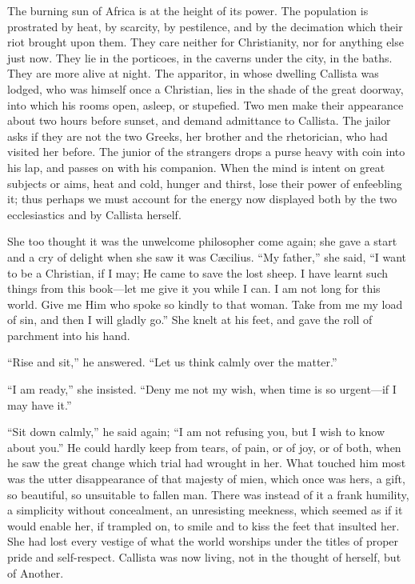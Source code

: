 The burning sun of Africa is at the height of its power. The
population is prostrated by heat, by scarcity, by pestilence, and by
the decimation which their riot brought upon them. They care neither
for Christianity, nor for anything else just now. They lie in the
porticoes, in the caverns under the city, in the baths. They are more
alive at night. The apparitor, in whose dwelling Callista was lodged,
who was himself once a Christian, lies in the shade of the great
doorway, into which his rooms open, asleep, or stupefied. Two men make
their appearance about two hours before sunset, and demand admittance
to Callista. The jailor asks if they are not the two Greeks, her
brother and the rhetorician, who had visited her before. The junior of
the strangers drops a purse heavy with coin into his lap, and passes
on with his companion. When the mind is intent on great subjects or
aims, heat and cold, hunger and thirst, lose their power of enfeebling
it; thus perhaps we must account for the energy now displayed both by
the two ecclesiastics and by Callista herself.

She too thought it was the unwelcome philosopher come again; she
gave a start and a cry of delight when she saw it was Cæcilius.
``My father,'' she said, ``I want to be a Christian, if I
may; He came to save the lost sheep. I have learnt such things
from this book—let me give it you while I can. I am not long for
this world. Give me Him who spoke so kindly to that woman. Take from
me my load of sin, and then I will gladly go.'' She knelt at his
feet, and gave the roll of parchment into his hand.

``Rise and sit,'' he answered. ``Let us think calmly
over the matter.''

``I am ready,'' she insisted. ``Deny me not my wish,
when time is so urgent—if I may have it.''

``Sit down calmly,'' he said again; ``I am not refusing
you, but I wish to know about you.'' He could hardly keep from
tears, of pain, or of joy, or of both, when he saw the great change
which trial had wrought in her. What touched him most was the utter
disappearance of that majesty of mien, which once was hers, a gift, so
beautiful, so unsuitable to fallen man. There was instead of it a
frank humility, a simplicity without concealment, an unresisting
meekness, which seemed as if it would enable her, if trampled on, to
smile and to kiss the feet that insulted her. She had lost every
vestige of what the world worships under the titles of proper pride
and self-respect. Callista was now living, not in the thought of
herself, but of Another.

